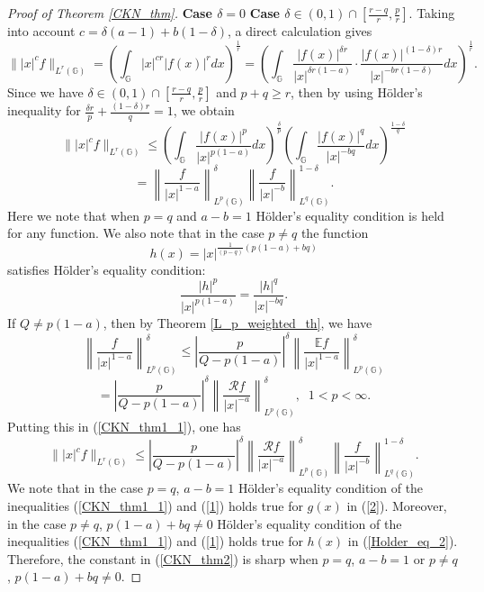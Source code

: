 \documentclass[a4paper,12pt,reqno]{amsart}
\renewcommand\eqref[1]{(\ref{#1})} %
\numberwithin{equation}{section}
\theoremstyle{plain}
\theoremstyle{definition}
\begin{document}
\begin{proof}[Proof of Theorem \ref{CKN_thm}] {\bf Case $\delta=0$}
{\bf Case $\delta\in(0,1)\cap\left[\frac{r-q}{r},\frac{p}{r}\right]$}.
Taking into account $c=\delta(a-1)+b(1-\delta)$,  a direct calculation gives $$\||x|^{c}f\|_{L^{r}(\mathbb{G})}=
\left(\int_{\mathbb{G}}|x|^{cr}|f(x)|^{r}dx\right)^{\frac{1}{r}}
=\left(\int_{\mathbb{G}}\frac{|f(x)|^{\delta r}}{|x|^{\delta r (1-a)}}\cdot \frac{|f(x)|^{(1-\delta)r}}{|x|^{-br(1-\delta)}}dx\right)^{\frac{1}{r}}.$$
Since we have $\delta\in(0,1)\cap\left[\frac{r-q}{r},\frac{p}{r}\right]$ and $p+q\geq r$, then by using H\"{o}lder's inequality for $\frac{\delta r}{p}+\frac{(1-\delta)r}{q}=1$, we obtain
$$\||x|^{c}f\|_{L^{r}(\mathbb{G})}
\leq \left(\int_{\mathbb{G}}\frac{|f(x)|^{p}}{|x|^{p(1-a)}}dx\right)^{\frac{\delta}{p}}
\left(\int_{\mathbb{G}}\frac{|f(x)|^{q}}{|x|^{-bq}}dx\right)^{\frac{1-\delta}{q}}$$
\begin{equation}\label{CKN_thm1_1}=\left\|\frac{f}{|x|^{1-a}}\right\|^{\delta}_{L^{p}(\mathbb{G})}
\left\|\frac{f}{|x|^{-b}}\right\|^{1-\delta}_{L^{q}(\mathbb{G})}.
\end{equation}
Here we note that when $p=q$ and $a-b=1$ H\"{o}lder's equality condition is held for any function. We also note that in the case $p\neq q$ the function
\begin{equation}\label{Holder_eq_2}
h(x)=|x|^{\frac{1}{(p-q)}\left(p(1-a)+bq\right)}
\end{equation} satisfies H\"{o}lder's equality condition:
$$\frac{|h|^{p}}{|x|^{p(1-a)}}=\frac{|h|^{q}}{|x|^{-bq}}.$$
If $Q\neq p(1-a)$, then by Theorem \ref{L_p_weighted_th}, we have
$$\left\|\frac{f}{|x|^{1-a}}\right\|^{\delta}_{L^{p}(\mathbb{G})}\leq
\left|\frac{p}{Q-p(1-a)}\right|^{\delta} \left\|\frac{\mathbb{E}f}{|x|^{1-a}}\right\|^{\delta}_{L^{p}(\mathbb{G})}$$
\begin{equation}\label{1}=
\left|\frac{p}{Q-p(1-a)}\right|^{\delta} \left\|\frac{\mathcal{R}f}{|x|^{-a}}\right\|^{\delta}_{L^{p}(\mathbb{G})}, \;\;1<p<\infty.
\end{equation}
Putting this in \eqref{CKN_thm1_1}, one has
$$\||x|^{c}f\|_{L^{r}(\mathbb{G})}\leq
\left|\frac{p}{Q-p(1-a)}\right|^{\delta} \left\|\frac{\mathcal{R}f}{|x|^{-a}}\right\|^{\delta}_{L^{p}(\mathbb{G})}
\left\|\frac{f}{|x|^{-b}}\right\|^{1-\delta}_{L^{q}(\mathbb{G})}.$$
We note that in the case $p=q$, $a-b=1$ H\"older's equality condition of the inequalities \eqref{CKN_thm1_1} and \eqref{1} holds true for $g(x)$ in \eqref{2}. Moreover, in the case $p\neq q$, $p(1-a)+bq\neq0$ H\"older's equality condition of the inequalities \eqref{CKN_thm1_1} and \eqref{1} holds true for $h(x)$ in \eqref{Holder_eq_2}. Therefore, the constant in \eqref{CKN_thm2} is sharp when $p=q$, $a-b=1$ or $p\neq q$, $p(1-a)+bq\neq0$.


\end{proof}
\end{document}
